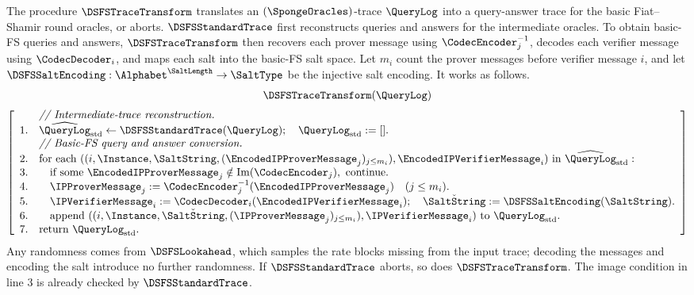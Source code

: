 \begin{definition}[D2STrace]
\label{def:dsfs_d2strace}
\leanok
{}
The procedure \(\DSFSTraceTransform\) translates an \((\SpongeOracles)\)-trace \(\QueryLog\) into a query-answer trace for the basic Fiat--Shamir round oracles, or aborts. \(\DSFSStandardTrace\) first reconstructs queries and answers for the intermediate oracles. To obtain basic-FS queries and answers, \(\DSFSTraceTransform\) then recovers each prover message using \(\CodecEncoder_j^{-1}\), decodes each verifier message using \(\CodecDecoder_i\), and maps each salt into the basic-FS salt space. Let \(m_i\) count the prover messages before verifier message \(i\), and let \(\DSFSSaltEncoding:\Alphabet^{\SaltLength}\to\SaltType\) be the injective salt encoding. It works as follows.
\begin{equation*}
\begin{gathered}
\DSFSTraceTransform(\QueryLog)\\[2pt]
\left[\begin{array}{rl}
& \textit{// Intermediate-trace reconstruction.}\\
1.& \widehat{\QueryLog}_{\mathrm{std}}\leftarrow\DSFSStandardTrace(\QueryLog);\quad \QueryLog_{\mathrm{std}}:=[].\\
& \textit{// Basic-FS query and answer conversion.}\\
2.& \text{for each }((i,\Instance,\SaltString,(\EncodedIPProverMessage_j)_{j\le m_i}),\EncodedIPVerifierMessage_i)\text{ in }\widehat{\QueryLog}_{\mathrm{std}}:\\
3.& \quad\text{if some }\EncodedIPProverMessage_j\notin\operatorname{Im}(\CodecEncoder_j),\ \text{continue}.\\
4.& \quad\IPProverMessage_j:=\CodecEncoder_j^{-1}(\EncodedIPProverMessage_j)\quad(j\le m_i).\\
5.& \quad\IPVerifierMessage_i:=\CodecDecoder_i(\EncodedIPVerifierMessage_i);\quad\check\SaltString:=\DSFSSaltEncoding(\SaltString).\\
6.& \quad\text{append }((i,\Instance,\check\SaltString,(\IPProverMessage_j)_{j\le m_i}),\IPVerifierMessage_i)\text{ to }\QueryLog_{\mathrm{std}}.\\
7.& \text{return }\QueryLog_{\mathrm{std}}.
\end{array}\right]
\end{gathered}
\end{equation*}
Any randomness comes from \(\DSFSLookahead\), which samples the rate blocks missing from the input trace; decoding the messages and encoding the salt introduce no further randomness. If \(\DSFSStandardTrace\) aborts, so does \(\DSFSTraceTransform\). The image condition in line 3 is already checked by \(\DSFSStandardTrace\).


\end{definition}
